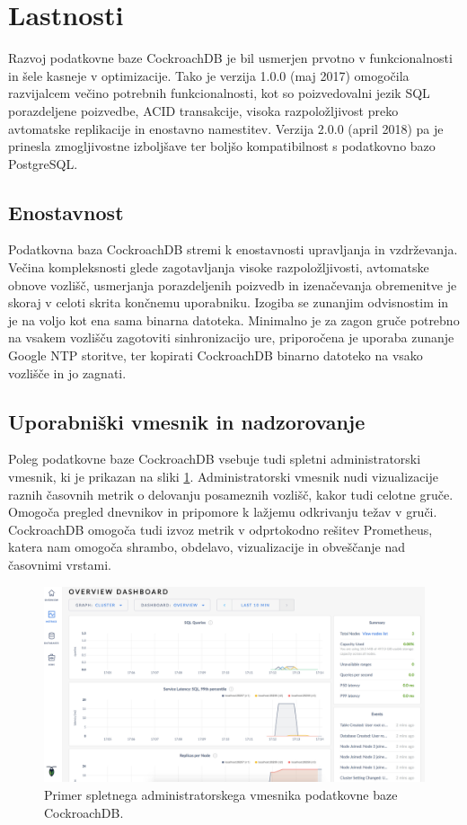 \documentclass[a4paper, 12pt]{book}
\begin{document}
\section{Lastnosti}
Razvoj podatkovne baze CockroachDB je bil usmerjen prvotno v funkcionalnosti in šele kasneje v optimizacije. Tako je verzija 1.0.0 (maj 2017) omogočila razvijalcem večino potrebnih funkcionalnosti, kot so poizvedovalni jezik SQL porazdeljene poizvedbe, ACID transakcije, visoka razpoložljivost preko avtomatske replikacije in enostavno namestitev. Verzija 2.0.0 (april 2018) pa je prinesla zmogljivostne izboljšave ter boljšo kompatibilnost s podatkovno bazo PostgreSQL.

\subsection{Enostavnost}
Podatkovna baza CockroachDB stremi k enostavnosti upravljanja in vzdr\-že\-van\-ja. Večina kompleksnosti glede zagotavljanja visoke razpoložljivosti, avtomatske obnove vozlišč, usmerjanja porazdeljenih poizvedb in izenačevanja obremenitve je skoraj v celoti skrita končnemu uporabniku. Izogiba se zunanjim odvisnostim in je na voljo kot ena sama binarna datoteka. Minimalno je za zagon gruče potrebno na vsakem vozlišču zagotoviti sinhronizacijo ure, priporočena je uporaba zunanje Google NTP storitve, ter kopirati CockroachDB binarno datoteko na vsako vozlišče in jo zagnati.

\subsection{Uporabniški vmesnik in nadzorovanje}
Poleg podatkovne baze CockroachDB vsebuje tudi spletni administratorski vmesnik, ki je prikazan na sliki \ref{img_crdb_admin_ui}. Administratorski vmesnik nudi vizualizacije raznih časovnih metrik o delovanju posameznih vozlišč, kakor tudi celotne gruče. Omogoča pregled dnevnikov in pripomore k lažjemu odkrivanju težav v gruči. CockroachDB omogoča tudi izvoz metrik v odprtokodno rešitev Prometheus, katera nam omogoča shrambo, obdelavo, vizualizacije in obveščanje nad časovnimi vrstami.

\begin{figure}[H]
\begin{center}
\includegraphics[width=1\textwidth]{resources/crdb_admin_ui.png}
\end{center}
\caption{Primer spletnega administratorskega vmesnika podatkovne baze CockroachDB.}
\label{img_crdb_admin_ui}
\end{figure}
\end{document}
